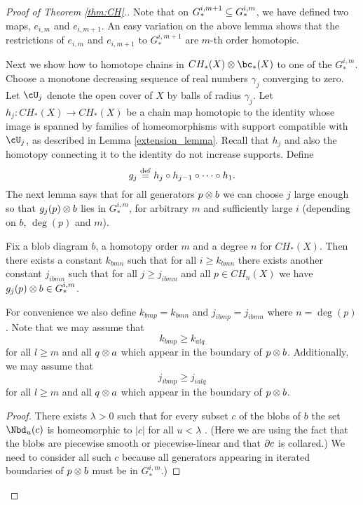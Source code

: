 {\begin{proof}[Proof of Theorem \ref{thm:CH}.]
Note that on $G_*^{i,m+1} \subseteq G_*^{i,m}$, we have defined two maps,
$e_{i,m}$ and $e_{i,m+1}$.
An easy variation on the above lemma shows that 
the restrictions of $e_{i,m}$ and $e_{i,m+1}$ to $G_*^{i,m+1}$ are $m$-th 
order homotopic.

Next we show how to homotope chains in $CH_*(X)\ot \bc_*(X)$ to one of the 
$G_*^{i,m}$.
Choose a monotone decreasing sequence of real numbers $\gamma_j$ converging to zero.
Let $\cU_j$ denote the open cover of $X$ by balls of radius $\gamma_j$.
Let $h_j: CH_*(X)\to CH_*(X)$ be a chain map homotopic to the identity whose image is 
spanned by families of homeomorphisms with support compatible with $\cU_j$, 
as described in Lemma \ref{extension_lemma}.
Recall that $h_j$ and also the homotopy connecting it to the identity do not increase
supports.
Define
\[
	g_j \stackrel{\mathrm{def}}{=} h_j\circ h_{j-1} \circ \cdots \circ h_1 .
\]
The next lemma says that for all generators $p\otimes b$ we can choose $j$ large enough so that
$g_j(p)\otimes b$ lies in $G_*^{i,m}$, for arbitrary $m$ and sufficiently large $i$ 
(depending on $b$, $\deg(p)$ and $m$).

\begin{lemma} \label{Gim_approx}
Fix a blob diagram $b$, a homotopy order $m$ and a degree $n$ for $CH_*(X)$.
Then there exists a constant $k_{bmn}$ such that for all $i \ge k_{bmn}$
there exists another constant $j_{ibmn}$ such that for all $j \ge j_{ibmn}$ and all $p\in CH_n(X)$ 
we have $g_j(p)\otimes b \in G_*^{i,m}$.
\end{lemma}

For convenience we also define $k_{bmp} = k_{bmn}$
and $j_{ibmp} = j_{ibmn}$ where $n=\deg(p)$.
Note that we may assume that
\[
	k_{bmp} \ge k_{alq}
\]
for all $l\ge m$ and all $q\otimes a$ which appear in the boundary of $p\otimes b$.
Additionally, we may assume that
\[
	j_{ibmp} \ge j_{ialq}
\]
for all $l\ge m$ and all $q\otimes a$ which appear in the boundary of $p\otimes b$.


\begin{proof}

There exists $\lambda > 0$ such that for every  subset $c$ of the blobs of $b$ the set 
$\Nbd_u(c)$ is homeomorphic to $|c|$ for all $u < \lambda$ .
(Here we are using the fact that the blobs are 
piecewise smooth or piecewise-linear and that $\partial c$ is collared.)
We need to consider all such $c$ because all generators appearing in
iterated boundaries of $p\otimes b$ must be in $G_*^{i,m}$.)


\end{proof}
\end{proof}}
